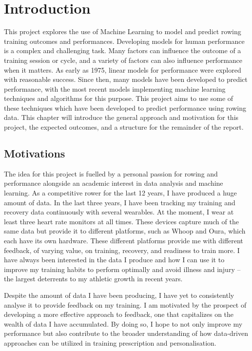 \chapter{\label{ch:intro}Introduction}
This project explores the use of Machine Learning to model and predict rowing training outcomes and performances. Developing models for human performance is a complex and challenging task. Many factors can influence the outcome of a training session or cycle, and a variety of factors can also influence performance when it matters. As early as 1975, linear models for performance were explored with reasonable success. Since then, many models have been developed to predict performance, with the most recent models implementing machine learning techniques and algorithms for this purpose. This project aims to use some of these techniques which have been developed to predict performance using rowing data. This chapter will introduce the general approach and motivation for this project, the expected outcomes, and a structure for the remainder of the report.

\section{Motivations}
The idea for this project is fuelled by a personal passion for rowing and performance alongside an academic interest in data analysis and machine learning. As a competitive rower for the last 12 years, I have produced a huge amount of data. In the last three years, I have been tracking my training and recovery data continuously with several wearables. At the moment, I wear at least three heart rate monitors at all times. These devices capture much of the same data but provide it to different platforms, such as Whoop and Oura, which each have its own hardware. These different platforms provide me with different feedback, of varying value, on training, recovery, and readiness to train more. I have always been interested in the data I produce and how I can use it to improve my training habits to perform optimally and avoid illness and injury -- the largest deterrents to my athletic growth in recent years. 

Despite the amount of data I have been producing, I have yet to consistently analyse it to provide feedback on my training. I am motivated by the prospect of developing a more effective approach to feedback, one that capitalizes on the wealth of data I have accumulated. By doing so, I hope to not only improve my performance but also contribute to the broader understanding of how data-driven approaches can be utilized in training prescription and personalisation.

